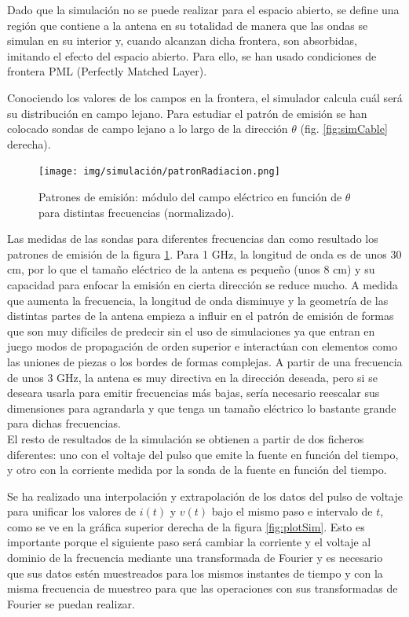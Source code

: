 \documentclass[11pt,a4paper,twoside,pdf]{article}
\numberwithin{equation}{section}
\begin{document}
Dado que la simulación no se puede realizar para el espacio abierto, se define una región que contiene a la antena en su totalidad de manera que las ondas se simulan en su interior y, cuando alcanzan dicha frontera, son absorbidas, imitando el efecto del espacio abierto. Para ello, se han usado condiciones de frontera PML (Perfectly Matched Layer).

Conociendo los valores de los campos en la frontera, el simulador calcula cuál será su distribución en campo lejano. Para estudiar el patrón de emisión se han colocado sondas de campo lejano a lo largo de la dirección $\theta$ (fig. \ref{fig:simCable} derecha).

\begin{figure}[!h]
    \centering
    \texttt{[image: img/simulación/patronRadiacion.png]}
    \vspace{-0.5cm}
    \caption{Patrones de emisión: módulo del campo eléctrico en función de $\theta$ para distintas frecuencias (normalizado).}
    \label{fig:patronEmision}
\end{figure}
Las medidas de las sondas para diferentes frecuencias dan como resultado los patrones de emisión de la figura \ref{fig:patronEmision}. Para 1 GHz, la longitud de onda es de unos 30 cm, por lo que el tamaño eléctrico de la antena es pequeño (unos 8 cm) y su capacidad para enfocar la emisión en cierta dirección se reduce mucho. A medida que aumenta la frecuencia, la longitud de onda disminuye y la geometría de las distintas partes de la antena empieza a influir en el patrón de emisión de formas que son muy difíciles de predecir sin el uso de simulaciones ya que entran en juego modos de propagación de orden superior e interactúan con elementos como las uniones de piezas o los bordes de formas complejas. A partir de una frecuencia de unos 3 GHz, la antena es muy directiva en la dirección deseada, pero si se deseara usarla para emitir frecuencias más bajas, sería necesario reescalar sus dimensiones para agrandarla y que tenga un tamaño eléctrico lo bastante grande para dichas frecuencias.\\

El resto de resultados de la simulación se obtienen a partir de dos ficheros diferentes: uno con el voltaje del pulso que emite la fuente en función del tiempo, y otro con la corriente medida por la sonda de la fuente en función del tiempo. 

Se ha realizado una interpolación y extrapolación de los datos del pulso de voltaje para unificar los valores de $i(t)$ y $v(t)$ bajo el mismo paso e intervalo de $t$, como se ve en la gráfica superior derecha de la figura \ref{fig:plotSim}. Esto es importante porque el siguiente paso será cambiar la corriente y el voltaje al dominio de la frecuencia mediante una transformada de Fourier y es necesario que sus datos estén muestreados para los mismos instantes de tiempo y con la misma frecuencia de muestreo para que las operaciones con sus transformadas de Fourier se puedan realizar. 
\end{document}
